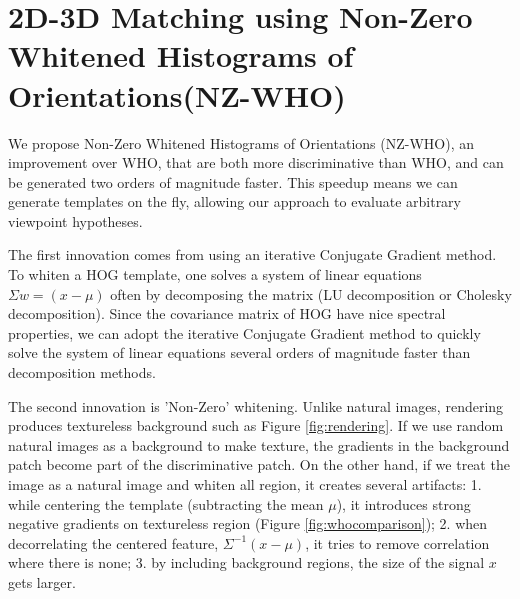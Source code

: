 \documentclass[10pt,twocolumn,letterpaper]{article}
\begin{document}

\section{2D-3D Matching using Non-Zero Whitened Histograms of Orientations(NZ-WHO)}
\label{sec:nz-who}

We propose Non-Zero Whitened Histograms of Orientations (NZ-WHO), an improvement over WHO, that are both more discriminative than WHO, and can be generated two orders of magnitude faster. This speedup means we can generate templates on the fly, allowing our approach to evaluate arbitrary viewpoint hypotheses. 

The first innovation comes from using an iterative Conjugate Gradient method. To whiten a HOG template, one solves a system of linear equations $\Sigma w = (x - \mu)$ often by decomposing the matrix (LU decomposition or Cholesky decomposition). Since the covariance matrix of HOG have nice spectral properties, we can adopt the iterative Conjugate Gradient method to quickly solve the system of linear equations several orders of magnitude faster than decomposition methods.

The second innovation is 'Non-Zero' whitening. Unlike natural images, rendering produces textureless background such as Figure \ref{fig:rendering}. If we use random natural images as a background to make texture, the gradients in the background patch become part of the discriminative patch. On the other hand, if we treat the image as a natural image and whiten all region, it creates several artifacts: 1. while centering the template (subtracting the mean $\mu$), it introduces strong negative gradients on textureless region (Figure \ref{fig:whocomparison}); 2. when decorrelating the centered feature, $\Sigma^{-1}(x - \mu)$, it tries to remove correlation where there is none; 3. by including background regions, the size of the signal $x$ gets larger. 
\end{document}

